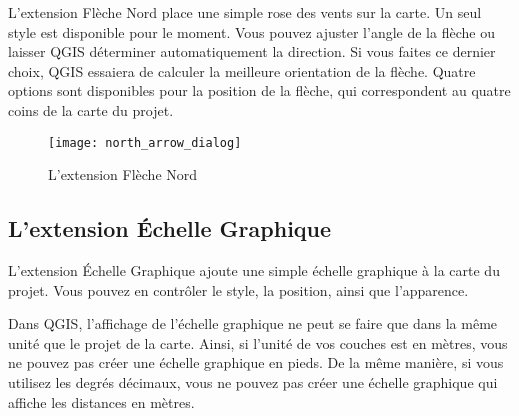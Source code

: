 L'extension Flèche Nord place une simple rose des vents sur la carte. Un seul
style est disponible pour le moment. Vous pouvez ajuster l'angle de la flèche 
ou laisser QGIS déterminer automatiquement la direction. Si vous faites ce 
dernier choix, QGIS essaiera de calculer la meilleure orientation de la flèche.
Quatre options sont disponibles pour la position de la flèche, qui correspondent
au quatre coins de la carte du projet.

\begin{figure}[ht]
   \begin{center}
   \texttt{[image: north\_arrow\_dialog]} 
   \caption{L'extension Flèche Nord \nixcaption}\label{fig:north_arrow}
\end{center}  
\end{figure}

\subsection{L'extension Échelle Graphique}

L'extension Échelle Graphique ajoute une simple échelle graphique à la carte du
projet.
Vous pouvez en contrôler le style, la position, ainsi que l'apparence.

Dans QGIS, l'affichage de l'échelle graphique ne peut se faire que dans la même 
unité que le projet de la carte. Ainsi, si l'unité de vos couches est en mètres, 
vous ne pouvez pas créer une échelle graphique en pieds. De la même manière, si 
vous utilisez les degrés décimaux, vous ne pouvez pas créer une échelle 
graphique qui affiche les distances en mètres.

